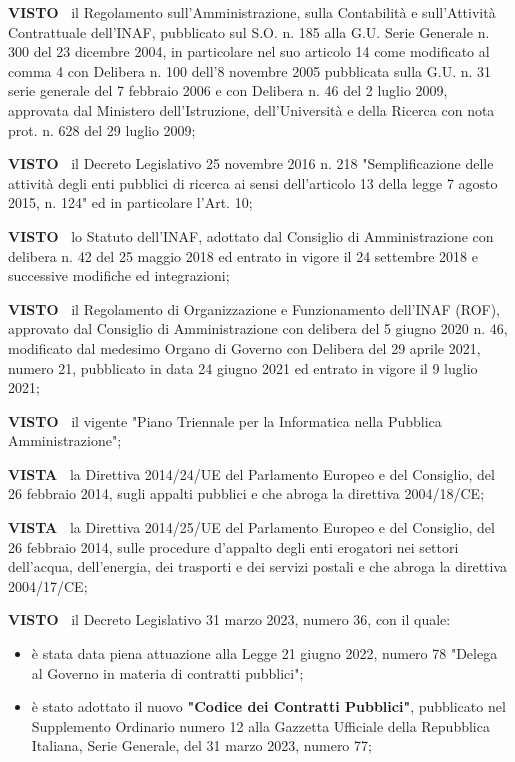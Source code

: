 \textbf{VISTO~}	il Regolamento sull'Amministrazione, sulla Contabilità
e sull'Attività Contrattuale dell'INAF, pubblicato sul S.O. n. 185
alla G.U. Serie Generale n. 300 del 23 dicembre 2004, in particolare
nel suo articolo 14 come modificato al comma 4 con Delibera n. 100
dell'8 novembre 2005 pubblicata sulla G.U. n. 31 serie generale del
7 febbraio 2006 e con Delibera n. 46 del 2 luglio 2009, approvata dal
Ministero dell'Istruzione, dell'Università e della Ricerca con nota
prot. n. 628 del 29 luglio 2009;

\textbf{VISTO~}	il Decreto Legislativo 25 novembre 2016 n. 218
"Semplificazione delle attività degli enti pubblici di ricerca ai
sensi dell'articolo 13 della legge 7 agosto 2015, n. 124" ed in
particolare l'Art. 10;

\textbf{VISTO~}	lo Statuto dell'INAF, adottato dal Consiglio di
Amministrazione con delibera n. 42 del 25 maggio 2018 ed entrato in
vigore il 24 settembre 2018 e successive modifiche ed integrazioni;

\textbf{VISTO~}	 il Regolamento di Organizzazione e Funzionamento
dell'INAF (ROF), approvato dal Consiglio di Amministrazione con delibera
del 5 giugno 2020 n. 46, modificato dal medesimo Organo di Governo con
Delibera del 29 aprile 2021, numero 21, pubblicato in data 24 giugno
2021 ed entrato in vigore il 9 luglio 2021;

\textbf{VISTO~}	il vigente "Piano Triennale per la Informatica nella Pubblica
Amministrazione";

\textbf{VISTA~}	la Direttiva 2014/24/UE del Parlamento Europeo e del
Consiglio, del 26 febbraio 2014, sugli appalti pubblici e che abroga la
direttiva 2004/18/CE;  

\textbf{VISTA~}	la Direttiva 2014/25/UE del Parlamento Europeo e del
Consiglio, del 26 febbraio 2014, sulle procedure d'appalto degli enti
erogatori nei settori dell'acqua, dell'energia, dei trasporti e dei
servizi postali e che abroga la direttiva 2004/17/CE; 

\textbf{VISTO~}	il Decreto Legislativo 31 marzo 2023, numero 36, con il
quale:
\begin{itemize}

\item  è stata data piena attuazione alla Legge 21 giugno 2022,
numero 78 "Delega al Governo in materia di contratti pubblici";

\item è stato adottato il nuovo \textbf{"Codice dei Contratti Pubblici"},
    pubblicato nel Supplemento Ordinario numero 12 alla Gazzetta Ufficiale
    della Repubblica Italiana, Serie Generale, del 31 marzo 2023, numero 77;
\end{itemize}

